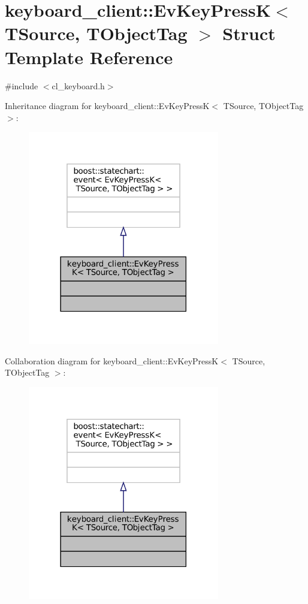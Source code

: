 \hypertarget{structkeyboard__client_1_1EvKeyPressK}{}\section{keyboard\+\_\+client\+:\+:Ev\+Key\+PressK$<$ T\+Source, T\+Object\+Tag $>$ Struct Template Reference}
\label{structkeyboard__client_1_1EvKeyPressK}


{\ttfamily \#include $<$cl\+\_\+keyboard.\+h$>$}



Inheritance diagram for keyboard\+\_\+client\+:\+:Ev\+Key\+PressK$<$ T\+Source, T\+Object\+Tag $>$\+:
\nopagebreak
\begin{figure}[H]
\begin{center}
\leavevmode
\includegraphics[width=237pt]{structkeyboard__client_1_1EvKeyPressK__inherit__graph}
\end{center}
\end{figure}


Collaboration diagram for keyboard\+\_\+client\+:\+:Ev\+Key\+PressK$<$ T\+Source, T\+Object\+Tag $>$\+:
\nopagebreak
\begin{figure}[H]
\begin{center}
\leavevmode
\includegraphics[width=237pt]{structkeyboard__client_1_1EvKeyPressK__coll__graph}
\end{center}
\end{figure}


